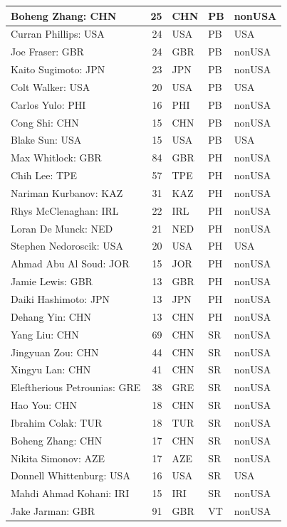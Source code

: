 \documentclass[
  10.5pt,
  letterpaper,
  DIV=11,
  numbers=noendperiod]{scrartcl}
\begin{document}
\begin{table}[H]
\begin{tabular}[t]{l|r|l|l|l}
\hline
Boheng Zhang: CHN & 25 & CHN & PB & nonUSA\\
\hline
Curran Phillips: USA & 24 & USA & PB & USA\\
\hline
Joe Fraser: GBR & 24 & GBR & PB & nonUSA\\
\hline
Kaito Sugimoto: JPN & 23 & JPN & PB & nonUSA\\
\hline
Colt Walker: USA & 20 & USA & PB & USA\\
\hline
Carlos Yulo: PHI & 16 & PHI & PB & nonUSA\\
\hline
Cong Shi: CHN & 15 & CHN & PB & nonUSA\\
\hline
Blake Sun: USA & 15 & USA & PB & USA\\
\hline
Max Whitlock: GBR & 84 & GBR & PH & nonUSA\\
\hline
Chih Lee: TPE & 57 & TPE & PH & nonUSA\\
\hline
Nariman Kurbanov: KAZ & 31 & KAZ & PH & nonUSA\\
\hline
Rhys McClenaghan: IRL & 22 & IRL & PH & nonUSA\\
\hline
Loran De Munck: NED & 21 & NED & PH & nonUSA\\
\hline
Stephen Nedoroscik: USA & 20 & USA & PH & USA\\
\hline
Ahmad Abu Al Soud: JOR & 15 & JOR & PH & nonUSA\\
\hline
Jamie Lewis: GBR & 13 & GBR & PH & nonUSA\\
\hline
Daiki Hashimoto: JPN & 13 & JPN & PH & nonUSA\\
\hline
Dehang Yin: CHN & 13 & CHN & PH & nonUSA\\
\hline
Yang Liu: CHN & 69 & CHN & SR & nonUSA\\
\hline
Jingyuan Zou: CHN & 44 & CHN & SR & nonUSA\\
\hline
Xingyu Lan: CHN & 41 & CHN & SR & nonUSA\\
\hline
Eleftherious Petrounias: GRE & 38 & GRE & SR & nonUSA\\
\hline
Hao You: CHN & 18 & CHN & SR & nonUSA\\
\hline
Ibrahim Colak: TUR & 18 & TUR & SR & nonUSA\\
\hline
Boheng Zhang: CHN & 17 & CHN & SR & nonUSA\\
\hline
Nikita Simonov: AZE & 17 & AZE & SR & nonUSA\\
\hline
Donnell Whittenburg: USA & 16 & USA & SR & USA\\
\hline
Mahdi Ahmad Kohani: IRI & 15 & IRI & SR & nonUSA\\
\hline
Jake Jarman: GBR & 91 & GBR & VT & nonUSA\\

\end{tabular}
\end{table}
\end{document}
